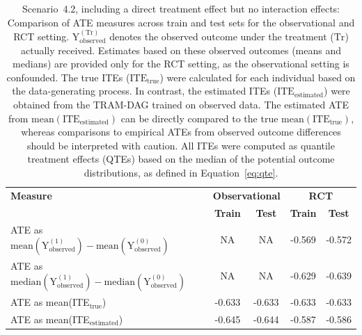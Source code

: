 \begin{table}[htbp]
\centering
\small
\caption{Scenario~4.2, including a direct treatment effect but no interaction effects: Comparison of ATE measures across train and test sets for the observational and RCT setting. $\text{Y}_\text{observed}^{(\text{Tr})}$ denotes the observed outcome under the treatment ($\text{Tr}$) actually received. Estimates based on these observed outcomes (means and medians) are provided only for the RCT setting, as the observational setting is confounded. The true ITEs ($\text{ITE}_\text{true}$) were calculated for each individual based on the data-generating process. In contrast, the estimated ITEs ($\text{ITE}_\text{estimated}$) were obtained from the TRAM-DAG trained on observed data. The estimated ATE from $\text{mean}(\text{ITE}_\text{estimated})$ can be directly compared to the true $\text{mean}(\text{ITE}_\text{true})$, whereas comparisons to empirical ATEs from observed outcome differences should be interpreted with caution. All ITEs were computed as quantile treatment effects (QTEs) based on the median of the potential outcome distributions, as defined in Equation~\ref{eq:qte}.}
\label{tab:scenario2_ate_comparison}
\begin{tabular}{l c c c c}
\toprule
\textbf{Measure} & \multicolumn{2}{c}{\textbf{Observational}} & \multicolumn{2}{c}{\textbf{RCT}} \\
\cmidrule(lr){2-3} \cmidrule(lr){4-5}
 & \textbf{Train} & \textbf{Test} & \textbf{Train} & \textbf{Test} \\
\midrule
ATE as $\text{mean}(\text{Y}_\text{observed}^{(1)}) - \text{mean}(\text{Y}_\text{observed}^{(0)})$ 
& NA & NA 
& -0.569 
& -0.572 \\

ATE as $\text{median}(\text{Y}_\text{observed}^{(1)}) - \text{median}(\text{Y}_\text{observed}^{(0)})$  
& NA & NA 
& -0.629 
& -0.639 \\

ATE as mean(ITE$_\text{true}$)  
& -0.633 
& -0.633 
& -0.633 
& -0.633 \\

ATE as mean(ITE$_\text{estimated}$) 
& -0.645 
& -0.644 
& -0.587 
& -0.586 \\
\bottomrule
\end{tabular}
\end{table}

